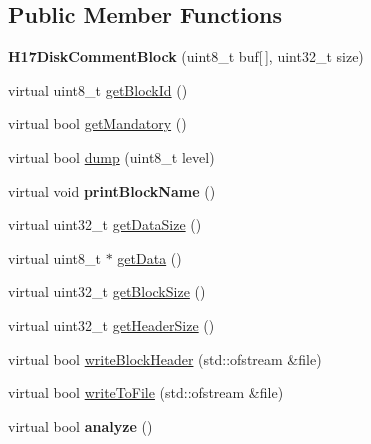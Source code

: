 \subsection*{Public Member Functions}
\begin{DoxyCompactItemize}
\item 
\hypertarget{classH17DiskCommentBlock_a02da2bd875311c0c99c065c80cc2a4f0}{}{\bfseries H17\+Disk\+Comment\+Block} (uint8\+\_\+t buf\mbox{[}$\,$\mbox{]}, uint32\+\_\+t size)\label{classH17DiskCommentBlock_a02da2bd875311c0c99c065c80cc2a4f0}

\item 
virtual uint8\+\_\+t \hyperlink{classH17DiskCommentBlock_a1247e20a1d272a4ab4193fef41e21f04}{get\+Block\+Id} ()
\item 
virtual bool \hyperlink{classH17DiskCommentBlock_a34786073ffc9c16050bd7bcda72bbf16}{get\+Mandatory} ()
\item 
virtual bool \hyperlink{classH17DiskCommentBlock_a9669888b64599e1b879ceaa6efb1bb71}{dump} (uint8\+\_\+t level)
\item 
\hypertarget{classH17DiskCommentBlock_aff04e188129b33b97742685d2ca24539}{}virtual void {\bfseries print\+Block\+Name} ()\label{classH17DiskCommentBlock_aff04e188129b33b97742685d2ca24539}

\item 
virtual uint32\+\_\+t \hyperlink{classH17Block_aa2e87b141623b4c897c5337ea0535d1c}{get\+Data\+Size} ()
\item 
virtual uint8\+\_\+t $\ast$ \hyperlink{classH17Block_a6c2432cccdacdfb1a335bd924f19d942}{get\+Data} ()
\item 
virtual uint32\+\_\+t \hyperlink{classH17Block_a0327b6359cdf502269bbb7c6f35fae18}{get\+Block\+Size} ()
\item 
virtual uint32\+\_\+t \hyperlink{classH17Block_ad71ae203afc8713d4ee7416757fadbbe}{get\+Header\+Size} ()
\item 
virtual bool \hyperlink{classH17Block_a5c4d56a6c991c87fb9215797ce63b804}{write\+Block\+Header} (std\+::ofstream \&file)
\item 
virtual bool \hyperlink{classH17Block_a59901675cd140c907fb6de4c8e0452d5}{write\+To\+File} (std\+::ofstream \&file)
\item 
\hypertarget{classH17Block_ae53600d945ed3ffac13d3a769a1e1ab2}{}virtual bool {\bfseries analyze} ()\label{classH17Block_ae53600d945ed3ffac13d3a769a1e1ab2}

\end{DoxyCompactItemize}
